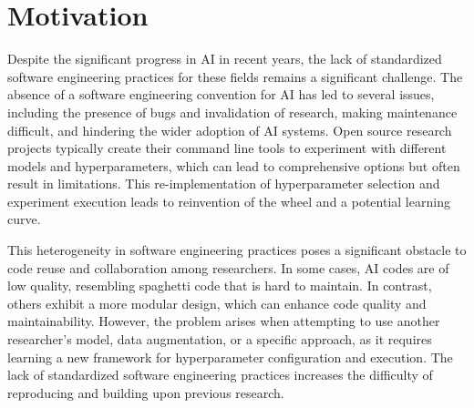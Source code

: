 
\section{Motivation}

Despite the significant progress in AI in recent years, the lack of standardized software engineering practices for these fields remains a significant challenge. The absence of a software engineering convention for AI  has led to several issues, including the presence of bugs and invalidation of research, making maintenance difficult, and hindering the wider adoption of AI systems. Open source research projects typically create their command line tools to experiment with different models and hyperparameters, which can lead to comprehensive options but often result in limitations. This re-implementation of hyperparameter selection and experiment execution leads to reinvention of the wheel and a potential learning curve.

This heterogeneity in software engineering practices poses a significant obstacle to code reuse and collaboration among researchers. In some cases, AI codes are of low quality, resembling spaghetti code that is hard to maintain. In contrast, others exhibit a more modular design, which can enhance code quality and maintainability. However, the problem arises when attempting to use another researcher's model, data augmentation, or a specific approach, as it requires learning a new framework for hyperparameter configuration and execution. The lack of standardized software engineering practices increases the difficulty of reproducing and building upon previous research.



